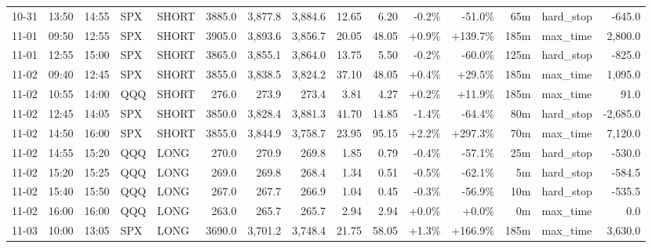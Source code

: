 \documentclass[11pt,a4paper,twoside]{article}
\begin{document}
\begin{landscape}
\begin{center}
\begin{longtable}{>{\color{txtmain}}l l l l l r r r r r r r r >{\color{txtmain}}l r}
10-31 & 13:50 & 14:55 & SPX & SHORT & 3885.0 & 3,877.8 & 3,884.6 & 12.65 & 6.20 & \textcolor{lossred}{-0.2\%} & \textcolor{lossred}{-51.0\%} & 65m & hard\_stop & \textcolor{lossred}{-645.0} \\
11-01 & 09:50 & 12:55 & SPX & SHORT & 3905.0 & 3,893.6 & 3,856.7 & 20.05 & 48.05 & \textcolor{wingreen}{+0.9\%} & \textcolor{wingreen}{+139.7\%} & 185m & max\_time & \textcolor{wingreen}{2,800.0} \\
11-01 & 12:55 & 15:00 & SPX & SHORT & 3865.0 & 3,855.1 & 3,864.0 & 13.75 & 5.50 & \textcolor{lossred}{-0.2\%} & \textcolor{lossred}{-60.0\%} & 125m & hard\_stop & \textcolor{lossred}{-825.0} \\
11-02 & 09:40 & 12:45 & SPX & SHORT & 3855.0 & 3,838.5 & 3,824.2 & 37.10 & 48.05 & \textcolor{wingreen}{+0.4\%} & \textcolor{wingreen}{+29.5\%} & 185m & max\_time & \textcolor{wingreen}{1,095.0} \\
11-02 & 10:55 & 14:00 & QQQ & SHORT & 276.0 & 273.9 & 273.4 & 3.81 & 4.27 & \textcolor{wingreen}{+0.2\%} & \textcolor{wingreen}{+11.9\%} & 185m & max\_time & \textcolor{wingreen}{91.0} \\
11-02 & 12:45 & 14:05 & SPX & SHORT & 3850.0 & 3,828.4 & 3,881.3 & 41.70 & 14.85 & \textcolor{lossred}{-1.4\%} & \textcolor{lossred}{-64.4\%} & 80m & hard\_stop & \textcolor{lossred}{-2,685.0} \\
11-02 & 14:50 & 16:00 & SPX & SHORT & 3855.0 & 3,844.9 & 3,758.7 & 23.95 & 95.15 & \textcolor{wingreen}{+2.2\%} & \textcolor{wingreen}{+297.3\%} & 70m & max\_time & \textcolor{wingreen}{7,120.0} \\
11-02 & 14:55 & 15:20 & QQQ & LONG & 270.0 & 270.9 & 269.8 & 1.85 & 0.79 & \textcolor{lossred}{-0.4\%} & \textcolor{lossred}{-57.1\%} & 25m & hard\_stop & \textcolor{lossred}{-530.0} \\
11-02 & 15:20 & 15:25 & QQQ & LONG & 269.0 & 269.8 & 268.4 & 1.34 & 0.51 & \textcolor{lossred}{-0.5\%} & \textcolor{lossred}{-62.1\%} & 5m & hard\_stop & \textcolor{lossred}{-584.5} \\
11-02 & 15:40 & 15:50 & QQQ & LONG & 267.0 & 267.7 & 266.9 & 1.04 & 0.45 & \textcolor{lossred}{-0.3\%} & \textcolor{lossred}{-56.9\%} & 10m & hard\_stop & \textcolor{lossred}{-535.5} \\
11-02 & 16:00 & 16:00 & QQQ & LONG & 263.0 & 265.7 & 265.7 & 2.94 & 2.94 & \textcolor{wingreen}{+0.0\%} & \textcolor{wingreen}{+0.0\%} & 0m & max\_time & \textcolor{wingreen}{0.0} \\
11-03 & 10:00 & 13:05 & SPX & LONG & 3690.0 & 3,701.2 & 3,748.4 & 21.75 & 58.05 & \textcolor{wingreen}{+1.3\%} & \textcolor{wingreen}{+166.9\%} & 185m & max\_time & \textcolor{wingreen}{3,630.0} \\

\end{longtable}
\end{center}
\end{landscape}
\end{document}
